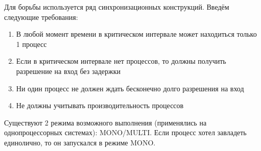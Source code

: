 \documentclass[a4paper,12pt]{article}
\begin{document}
	Для борьбы используется ряд синхронизационных конструкций. Введём следующие требования:
	\begin{enumerate}
		\item В любой момент времени в критическом интервале может находиться только 1 процесс
		\item Если в критическом интервале нет процессов, то должны получить разрешение на вход
		без задержки
		\item Ни один процесс не должен ждать бесконечно долго разрешения на вход
		\item Не должны учитывать производительность процессов
	\end{enumerate}	
	Существуют 2 режима возможного выполнения (применялись на однопроцессорных системах):
MONO/MULTI. Если процесс хотел завладеть единолично, то он запускался в режиме MONO.
\end{document}
